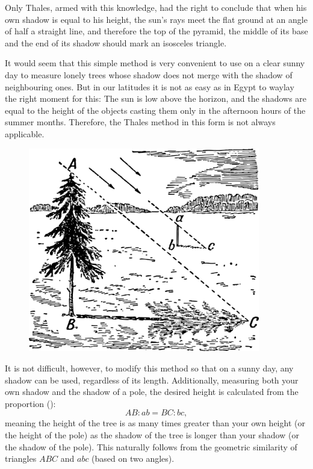 Only Thales, armed with this knowledge, had the right to conclude that when his own shadow is equal to his height, the sun's rays meet the flat ground at an angle of half a straight line, and therefore the top of the pyramid, the middle of its base and the end of its shadow should mark an isosceles triangle.

It would seem that this simple method is very convenient to use on a clear sunny day to measure lonely trees whose shadow does not merge with the shadow of neighbouring ones. But in our latitudes it is not as easy as in Egypt to waylay the right moment for this: The sun is low above the horizon, and the shadows are equal to the height of the objects casting them only in the afternoon hours of the summer months. Therefore, the Thales method in this form is not always applicable.

\begin{figure}[h!]
\centering
\includegraphics[width=0.9\textwidth]{figures/ch-01/fig-01-01.pdf}
\end{figure}
It is not difficult, however, to modify this method so that on a sunny day, any shadow can be used, regardless of its length. Additionally, measuring both your own shadow and the shadow of a pole, the desired height is calculated from the proportion ():
\begin{equation*}%
AB:ab = BC:bc,
\end{equation*}
meaning the height of the tree is as many times greater than your own height (or the height of the pole) as the shadow of the tree is longer than your shadow (or the shadow of the pole). This naturally follows from the geometric similarity of triangles $ABC$ and $abc$ (based on two angles).

